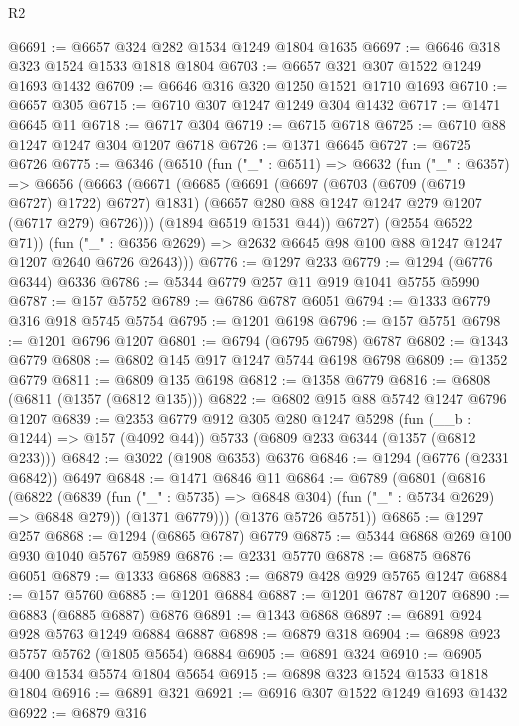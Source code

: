 \begin{lexlean}{R2}
\begin{coremodule}
@6691 := @6657 @324 @282 @1534 @1249 @1804 @1635
@6697 := @6646 @318 @323 @1524 @1533 @1818 @1804
@6703 := @6657 @321 @307 @1522 @1249 @1693 @1432
@6709 := @6646 @316 @320 @1250 @1521 @1710 @1693
@6710 := @6657 @305
@6715 := @6710 @307 @1247 @1249 @304 @1432
@6717 := @1471 @6645 @11
@6718 := @6717 @304
@6719 := @6715 @6718
@6725 := @6710 @88 @1247 @1247 @304 @1207 @6718
@6726 := @1371 @6645
@6727 := @6725 @6726
@6775 := @6346
    (@6510
      (fun ("_" : @6511) =>
      @6632
        (fun ("_" : @6357) =>
        @6656
          (@6663
            (@6671
              (@6685
                (@6691
                  (@6697 (@6703 (@6709 (@6719 @6727) @1722) @6727) @1831)
                  (@6657 @280 @88 @1247 @1247 @279 @1207 (@6717 @279) @6726)))
              (@1894 @6519 @1531 @44))
            @6727)
          (@2554 @6522 @71))
        (fun ("_" : @6356 @2629) => @2632 @6645 @98 @100 @88 @1247 @1247 @1207 @2640 @6726 @2643)))
@6776 := @1297 @233
@6779 := @1294 (@6776 @6344) @6336
@6786 := @5344 @6779 @257 @11 @919 @1041 @5755 @5990
@6787 := @157 @5752
@6789 := @6786 @6787 @6051
@6794 := @1333 @6779 @316 @918 @5745 @5754
@6795 := @1201 @6198
@6796 := @157 @5751
@6798 := @1201 @6796 @1207
@6801 := @6794 (@6795 @6798) @6787
@6802 := @1343 @6779
@6808 := @6802 @145 @917 @1247 @5744 @6198 @6798
@6809 := @1352 @6779
@6811 := @6809 @135 @6198
@6812 := @1358 @6779
@6816 := @6808 (@6811 (@1357 (@6812 @135)))
@6822 := @6802 @915 @88 @5742 @1247 @6796 @1207
@6839 := @2353
    @6779
    @912
    @305
    @280
    @1247
    @5298
    (fun (__b : @1244) => @157 (@4092 @44))
    @5733
    (@6809 @233 @6344 (@1357 (@6812 @233)))
@6842 := @3022 (@1908 @6353) @6376
@6846 := @1294 (@6776 (@2331 @6842)) @6497
@6848 := @1471 @6846 @11
@6864 := @6789
    (@6801
      (@6816
        (@6822
          (@6839 (fun ("_" : @5735) => @6848 @304) (fun ("_" : @5734 @2629) => @6848 @279))
          (@1371 @6779)))
      (@1376 @5726 @5751))
@6865 := @1297 @257
@6868 := @1294 (@6865 @6787) @6779
@6875 := @5344 @6868 @269 @100 @930 @1040 @5767 @5989
@6876 := @2331 @5770
@6878 := @6875 @6876 @6051
@6879 := @1333 @6868
@6883 := @6879 @428 @929 @5765 @1247
@6884 := @157 @5760
@6885 := @1201 @6884
@6887 := @1201 @6787 @1207
@6890 := @6883 (@6885 @6887) @6876
@6891 := @1343 @6868
@6897 := @6891 @924 @928 @5763 @1249 @6884 @6887
@6898 := @6879 @318
@6904 := @6898 @923 @5757 @5762 (@1805 @5654) @6884
@6905 := @6891 @324
@6910 := @6905 @400 @1534 @5574 @1804 @5654
@6915 := @6898 @323 @1524 @1533 @1818 @1804
@6916 := @6891 @321
@6921 := @6916 @307 @1522 @1249 @1693 @1432
@6922 := @6879 @316

\end{coremodule}
\end{lexlean}
